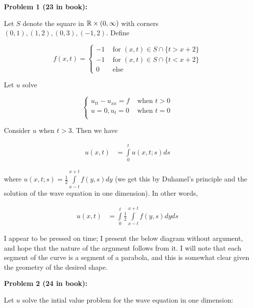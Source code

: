 \documentclass[a4paper,12pt]{article}
\begin{document}
{\bf Problem 1 (23 in book):}

Let $S$ denote the square in $\mathbb{R} \times (0,\infty)$ with corners $(0,1),(1,2),(0,3),(-1,2)$. Define

\begin{displaymath}
f(x,t) = 
   \left\{
     \begin{array}{lr}
       -1  & \text{ for } (x,t) \in S \cap \{t > x+2\} \\
       -1 & \text{ for } (x,t) \in S \cap \{t < x+2\} \\
       0 & \text{ else}
     \end{array}
   \right.
\end{displaymath}

Let $u$ solve

\begin{displaymath}
   \left\{
     \begin{array}{lr}
       u_{tt} - u_{xx} = f  & \text{ when } t>0 \\
       u=0, u_t = 0 & \text{ when } t=0 \\
     \end{array}
   \right.
\end{displaymath}

Consider $u$ when $t>3$. Then we have

\begin{align*}
u(x,t) &= \int\limits_0^t u(x,t;s)ds
\end{align*}

where $u(x,t;s) = \frac{1}{2} \int\limits_{x-t}^{x+t} f(y,s) dy$ (we get this by Duhamel's principle and the solution of the wave equation in one dimension). In other words,

\begin{align*}
u(x,t) &= \int\limits_0^t \frac{1}{2} \int\limits_{x-t}^{x+t} f(y,s) dyds
\end{align*}

I appear to be pressed on time; I present the below diagram without argument, and hope that the nature of the argument follows from it. I will note that each segment of the curve is a segment of a parabola, and this is somewhat clear given the geometry of the desired shape.

\shunt

\shunt

\shunt

{\bf Problem 2 (24 in book):}

Let $u$ solve the intial value problem for the wave equation in one dimension:
\end{document}
